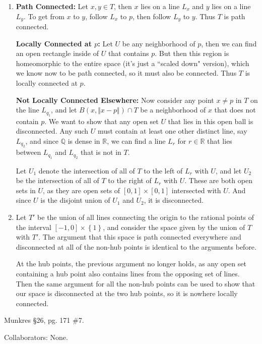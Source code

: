 \documentclass[10pt]{report}
\begin{document}
\begin{enumerate}
	\item \textbf{Path Connected:} Let $x,y \in T$, then $x$ lies on a line $L_x$ and $y$ lies on a line $L_y$. To get from $x$ to $y$, follow $L_x$ to $p$, then follow $L_y$ to $y$. Thus $T$ is path connected.

		\textbf{Locally Connected at $p$:} Let $U$ be any neighborhood of $p$, then we can find an open rectangle inside of $U$ that contains $p$. But then this region is homeomorphic to the entire space (it's just a ``scaled down" version), which we know now to be path connected, so it must also be connected. Thus $T$ is locally connected at $p$.

		\textbf{Not Locally Connected Elsewhere:} Now consider any point $x \neq p$ in $T$ on the line $L_{q_1}$, and let $B(x, {\Vert{x-p}\Vert}) \cap T$ be a neighborhood of $x$ that does not contain $p$. We want to show that any open set $U$ that lies in this open ball is disconnected. Any such $U$ must contain at least one other distinct line, say $L_{q_2}$, and since $\mathbb{Q}$ is dense in $\mathbb{R}$, we can find a line $L_r$ for $r\in \mathbb{R}$ that lies between $L_{q_1}$ and $L_{q_2}$ that is not in $T$.

		Let $U_1$ denote the intersection of all of $T$ to the left of $L_{r}$ with $U$, and let $U_2$ be the intersection of all of $T$ to the right of $L_{r}$ with $U$. These are both open sets in $U$, as they are open sets of $[0,1] \times [0,1]$ intersected with $U$. And since $U$ is the disjoint union of $U_1$ and $U_2$, it is disconnected.

	\item Let $T'$ be the union of all lines connecting the origin to the rational points of the interval $[-1,0] \times \left\{ 1 \right\}$, and consider the space given by the union of $T$ with $T'$. The argument that this space is path connected everywhere and disconnected at all of the non-hub points is identical to the arguments before.

		At the hub points, the previous argument no longer holds, as any open set containing a hub point also contains lines from the opposing set of lines. Then the same argument for all the non-hub points can be used to show that our space is disconnected at the two hub points, so it is nowhere locally connected.
\end{enumerate}

\begin{exer}[]
Munkres \S 26, pg. 171 \#7.
\end{exer}
{\color{blue}Collaborators: None.}
\end{document}

